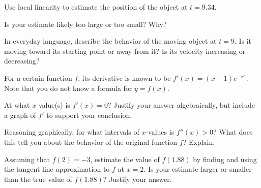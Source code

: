 \begin{exercises}
\ba
	\item Use local linearity to estimate the position of the object at $t = 9.34$.
	\item Is your estimate likely too large or too small?  Why?
	\item In everyday language, describe the behavior of the moving object at $t = 9$.  Is it moving toward its starting point or away from it? Is its velocity increasing or decreasing?
\ea

\item For a certain function $f$, its derivative is known to be $f'(x) = (x-1)e^{-x^2}$.  Note that you do not know a formula for $y = f(x)$.
\ba  
  	\item At what $x$-value(s) is $f'(x) = 0$?  Justify your answer algebraically, but include a graph of $f'$ to support your conclusion.
	\item Reasoning graphically, for what intervals of $x$-values is $f''(x) > 0$?  What does this tell you about the  behavior of the original function $f$?  Explain.
	\item Assuming that $f(2) = -3$, estimate the value of $f(1.88)$ by finding and using the tangent line approximation to $f$ at $x=2$.  Is your estimate larger or smaller than the true value of $f(1.88)$?  Justify your answer.
\ea



\end{exercises}
\afterexercises